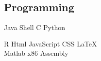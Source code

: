 \documentclass[letterpaper]{deedy-resume} %
\begin{document}
\begin{minipage}[t]{0.33\textwidth}
\sectionspace 

\subsection{Programming}

Java \textbullet{} Shell \textbullet{} C \textbullet{} Python

R \textbullet{} Html  \textbullet{} JavaScript  \textbullet{} CSS  \textbullet{} \LaTeX \\ 
Matlab \textbullet{} x86 Assembly \\
\sectionspace %


\end{minipage} %
\hfill
%
%
\end{document}

